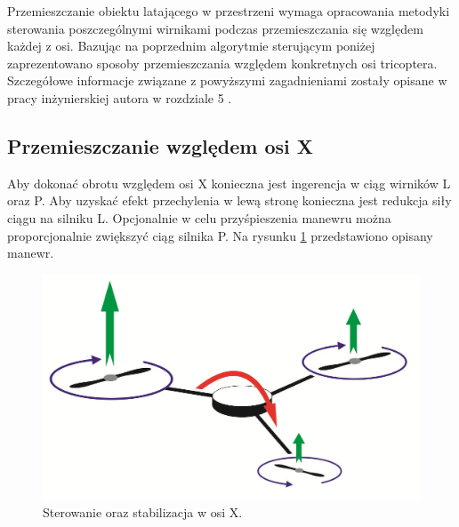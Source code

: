 Przemieszczanie obiektu latającego w przestrzeni wymaga opracowania metodyki sterowania poszczególnymi wirnikami podczas przemieszczania się względem każdej z osi.
Bazując na poprzednim algorytmie sterującym poniżej zaprezentowano sposoby przemieszczania względem konkretnych osi tricoptera. Szczegółowe informacje związane z powyższymi zagadnieniami zostały opisane w pracy inżynierskiej autora w rozdziale 5 \cite{inz}.

\subsection{Przemieszczanie względem osi X}
Aby dokonać obrotu względem osi X konieczna jest ingerencja w ciąg wirników L oraz P. Aby uzyskać efekt przechylenia w lewą stronę konieczna jest redukcja siły ciągu na silniku L. Opcjonalnie w celu przyśpieszenia manewru można proporcjonalnie zwiększyć ciąg silnika P. Na rysunku \ref{fig:axis_x} przedstawiono opisany manewr.

\begin{figure}[!htbp]
\centering
\includegraphics[width=0.7\linewidth]{./include/axis_x}
\caption{Sterowanie oraz stabilizacja w osi X.}
\label{fig:axis_x}
\end{figure}


